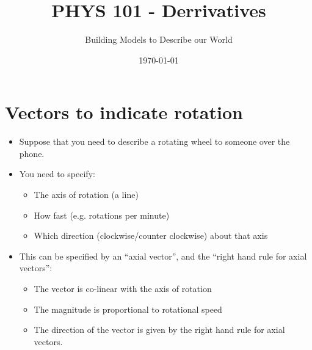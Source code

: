 \documentclass[aspectratio=169,
hyperref={colorlinks,urlcolor=blue}
]{beamer}
\begin{document}
\section{Vectors to indicate rotation}
\label{sec:rotationvectors}
{
\begin{itemize}
\item Suppose that you need to describe a rotating wheel to someone over the phone.
\item You need to specify:
\begin{itemize}
\item The axis of rotation (a line)
\item How fast (e.g. rotations per minute)
\item Which direction (clockwise/counter clockwise) about that axis
\end{itemize}
\item This can be specified by an “axial vector”, and the “right hand rule for axial vectors”:
\begin{itemize}
\item The vector is co-linear with the axis of rotation
\item The magnitude is proportional to rotational speed
\item The direction of the vector is given by the right hand rule for axial vectors.
\end{itemize}
\end{itemize}
}
{
}
\title{PHYS 101 - Derrivatives}
\institute{}
\author{Building Models to Describe our World}
\date{\today}


\begin{frame}
\titlepage
\thispagestyle{empty}
\end{frame}

\end{document}

